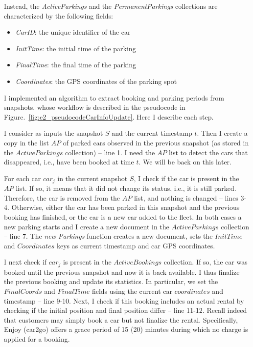 Instead, the \textit{ActiveParkings} and the \textit{PermanentParkings} collections are characterized by the following fields:
\begin{itemize}
\setlength\itemsep{0.1em}
\item \textit{CarID}: the unique identifier of the car
\item \textit{InitTime}: the initial time of the parking
\item \textit{FinalTime}:  the final time of the parking
\item \textit{Coordinates}: the GPS coordinates of the parking spot 
\end{itemize}




I implemented an algorithm to extract booking and parking periods from snapshots, whose workflow is described in the pseudocode in Figure.~\ref{fig:c2_pseudocodeCarInfoUpdate}. Here I describe each  step.

I consider as inputs the snapshot $S$ and the current timestamp $t$.
Then I create a copy in the list $AP$ of parked cars observed in the previous snapshot (as stored in the $ActiveParkings$ collection) -- line 1. I need the $AP$ list to detect the cars that disappeared, i.e., have been booked at time $t$. We will be back on this later.

For each car $car_j$ in the current snapshot $S$, I check if the car is present in the $AP$ list. 
If so, it means that it did not change its status, i.e., it is still parked. Therefore, the car is removed from the $AP$ list, and nothing is changed -- lines 3-4.
Otherwise, either the car has been parked in this snapshot and the previous booking has finished, or the car is a new car added to the fleet. In both cases a new parking starts and I create a new document in the $ActiveParkings$ collection -- line 7. The \textit{new Parkings} function creates a new document, sets the $InitTime$ and $Coordinates$ keys as current timestamp and car GPS coordinates.

I next check if $car_j$ is present in the $ActiveBookings$ collection. If so, the car was booked until the previous snapshot and now it is back available. I thus finalize the previous booking and update its statistics. In particular, we set the $FinalCoords$ and $FinalTime$ fields using the current car $coordinates$ and timestamp -- line 9-10. Next, I check if this booking includes an actual rental by checking if the initial position and final position differ -- line 11-12. Recall indeed that customers may simply book a car but not finalize the rental. Specifically, Enjoy (car2go) offers a grace period of 15 (20) minutes during which no charge is applied for a booking.

